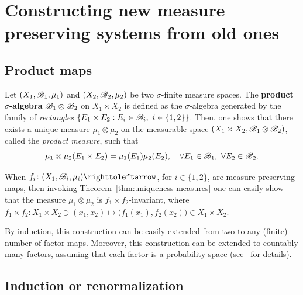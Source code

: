 \section{Constructing new measure preserving systems from old ones}\label{sec:constr-new-measure-pres-sys-old-ones}

\subsection{Product maps}\label{sec:product-maps}

Let $(X_{1},\mathscr{B}_{1},\mu_{1})$ and $(X_{2},\mathscr{B}_{2},\mu_{2})$ be two $\sigma$-finite measure spaces. The \textbf{product $\sigma$-algebra} $\mathscr{B}_{1}\otimes\mathscr{B}_{2}$ on $X_{1}\times X_{2}$ is defined as the $\sigma$-algebra generated by the family of \emph{rectangles} $\{E_{1}\times E_{2} : E_{i}\in\B_{i},\ i\in\{1,2\}\}$. Then, one shows that there exists a unique measure $\mu_{1}\otimes\mu_{2}$ on the measurable space $(X_{1}\times X_{2},\mathscr{B}_{1}\otimes\mathscr{B}_{2})$, called the \emph{product measure}, such that
\begin{displaymath}
  \mu_{1}\otimes\mu_{2}(E_{1}\times E_{2})=\mu_{1}(E_{1})\mu_{2}(E_{2}), \quad\forall E_{1}\in\B_{1},\ \forall E_{2}\in\B_{2}.
\end{displaymath}

When $f_{i}\colon (X_{1},\B_{i},\mu_{i})\carr$, for $i\in\{1,2\}$, are measure preserving maps, then invoking Theorem~\ref{thm:uniqueness-measures} one can easily show that the measure $\mu_{1}\otimes\mu_{2}$ is $f_{1}\times f_{2}$-invariant, where $f_{1}\times f_{2}\colon X_{1}\times X_{2}\ni (x_{1},x_{2})\mapsto \big(f_{1}(x_{1}),f_{2}(x_{2})\big)\in X_{1}\times X_{2}$.

By induction, this construction can be easily extended from two to any (finite) number of factor maps. Moreover, this construction can be extended to countably many factors, assuming that each factor is a probability space (see~\cite[Appendix A.2]{VianaOliveiraFoundErgTh} for details).


\subsection{Induction or renormalization}\label{sec:induct-or-renormalization}

